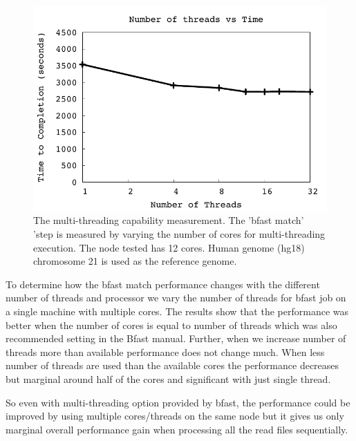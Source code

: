 \documentclass{acm_proc_article-sp}
\begin{document}
 \begin{figure}
 \centering
\includegraphics[scale=0.66]{figures/threadsvstime.pdf} 

\caption{\small The multi-threading capability measurement.  The 'bfast match' 'step is measured by varying the number of cores for multi-threading execution.  The node tested has 12 cores.  Human genome (hg18) chromosome 21 is used as the reference genome.  }
  \label{fig:parallel-execution} 
 \end{figure}
To determine how the bfast match performance changes with the different number of threads and processor we vary the number of threads for bfast job on a single machine with multiple cores. The results show that the performance was better when the number of cores is equal to number of threads which was also recommended setting in the Bfast manual. Further, when we increase number of threads more than available performance does not change much. When less number of threads are used than the available cores the performance decreases but marginal around half of the cores and significant with just single thread.


So even with multi-threading option provided by bfast, the performance
could be improved by using multiple cores/threads on the same node but
it gives us only marginal overall performance gain when processing all
the read files sequentially.
\end{document}
